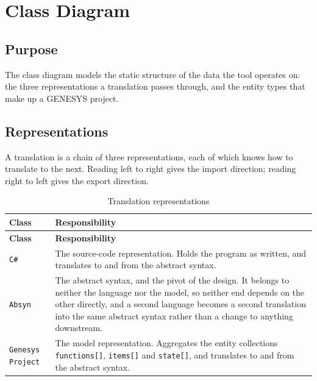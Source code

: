 \chapter{Class Diagram}
\label{ch:class}

\section{Purpose}

The class diagram models the static structure of the data the tool operates on:
the three representations a translation passes through, and the entity types
that make up a GENESYS project.


\section{Representations}

A translation is a chain of three representations, each of which knows how to
translate to the next. Reading left to right gives the import direction; reading
right to left gives the export direction.

\begin{longtable}{L{0.24\textwidth}L{0.68\textwidth}}
	\caption{Translation representations}\label{tab:representations}\\
	\toprule
	\textbf{Class} & \textbf{Responsibility} \\
	\midrule
	\endfirsthead
	\toprule
	\textbf{Class} & \textbf{Responsibility} \\
	\midrule
	\endhead

	\texttt{C\#} & The source-code representation. Holds the program as written,
	and translates to and from the abstract syntax. \\
	\addlinespace

	\texttt{Absyn} & The abstract syntax, and the pivot of the design. It belongs
	to neither the language nor the model, so neither end depends on the other
	directly, and a second language becomes a second translation into the same
	abstract syntax rather than a change to anything downstream. \\
	\addlinespace

	\texttt{Genesys Project} & The model representation. Aggregates the entity
	collections \texttt{functions[]}, \texttt{items[]} and \texttt{state[]}, and
	translates to and from the abstract syntax. \\
	\bottomrule
\end{longtable}

